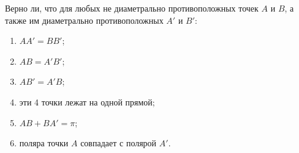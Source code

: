 Верно ли, что для любых не диаметрально противоположных точек $A$ и $B$,
 а также им диаметрально противоположных $A'$ и $B'$:
\begin{enumerate}
    \item $AA'=BB'$;
    \item $AB=A'B'$;
    \item $AB'=A'B$;
    \item эти 4 точки лежат на одной прямой;
    \item $AB+BA'=\pi$;
    \item поляра точки $A$ совпадает с полярой $A'$.
\end{enumerate}